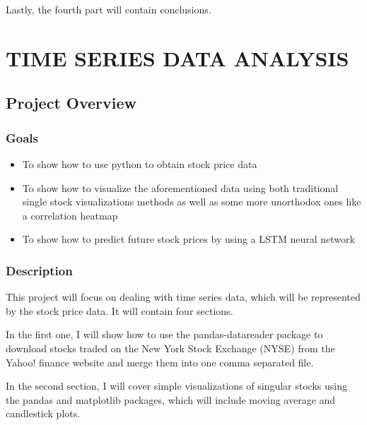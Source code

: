 \documentclass[12pt, a4paper]{article}
\begin{document}
Lastly, the fourth part will contain conclusions.

\newpage
\section{TIME SERIES DATA ANALYSIS}
\subsection{Project Overview}

\subsubsection{Goals}

\begin{itemize}
	\item To show how to use python to obtain stock price data
	\item To show how to visualize the aforementioned data using both traditional single stock visualizations methods as well as some more unorthodox ones like a correlation heatmap
	\item To show how to predict future stock prices by using a LSTM neural network
\end{itemize}

\subsubsection{Description}

This project will focus on dealing with time series data, which will be represented by the stock price data. It will contain four sections.

In the first one, I will show how to use the pandas-datareader package to download stocks traded on the New York Stock Exchange (NYSE) from the Yahoo! finance website and merge them into one comma separated file.

In the second section, I will cover simple visualizations of singular stocks using the pandas\cite{mckinney2010data_pandas} and matplotlib\cite{hunter2007matplotlib} packages, which will include moving average and candlestick plots.
\end{document}
